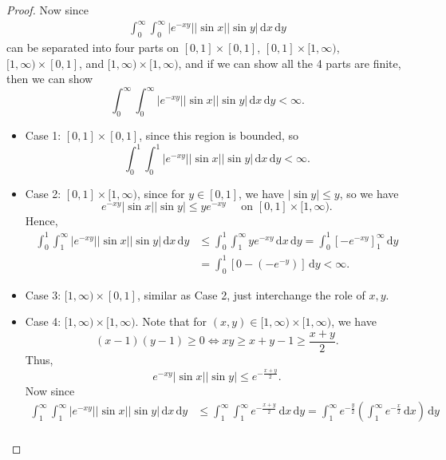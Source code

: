 \begin{proof}
    Now since 
    \begin{align*}
        \int _0^{\infty} \int _0^{\infty} \vert e^{-xy} \vert \vert \sin x \vert \vert \sin y \vert \, \mathrm{d} x \, \mathrm{d} y
    \end{align*}
    can be separated into four parts on \([0, 1] \times [0, 1]\), \([0, 1] \times [1, \infty)\), \([1, \infty) \times [0, 1]\), and \([1, \infty) \times [1, \infty)\), and if we can show all the 4 parts are finite, then we can show
    \[
        \int _0^{\infty} \int _0^{\infty} \vert e^{-xy} \vert \vert \sin x \vert \vert \sin y \vert \, \mathrm{d} x \, \mathrm{d} y < \infty.
    \] 
    \begin{itemize}
        \item Case 1: \([0, 1] \times [0, 1]\), since this region is bounded, so 
        \[
            \int _0^{1} \int _0^{1} \vert e^{-xy} \vert \vert \sin x \vert \vert \sin y \vert \, \mathrm{d} x \, \mathrm{d} y < \infty.
        \]
        \item Case 2: \([0, 1] \times [1, \infty)\), since for \(y \in [0, 1]\), we have \(\vert \sin y \vert \le y \), so we have 
        \[
            e^{-xy} \vert \sin x \vert \vert \sin y \vert \le y e^{-xy} \quad \text{ on } [0, 1] \times [1, \infty).   
        \]
        Hence,
        \begin{align*}
            \int _0^{1} \int _1^{\infty} \vert e^{-xy} \vert \vert \sin x \vert \vert \sin y \vert \, \mathrm{d} x \, \mathrm{d} y &\le \int _0^{1} \int _1^{\infty} y e^{-xy} \, \mathrm{d} x \, \mathrm{d} y = \int _0^1 \left[ - e^{-xy} \right]_1^{\infty} \, \mathrm{d} y \\
            &= \int _0^1 \left[ 0 - (-e^{-y}) \right] \, \mathrm{d} y < \infty.    
        \end{align*}
        \item Case 3: \([1, \infty) \times [0, 1]\), similar as Case 2, just interchange the role of \(x, y\). 
        \item Case 4: \([1, \infty) \times [1, \infty)\).  Note that for \((x, y) \in [1, \infty) \times [1, \infty)\), we have 
        \[
            (x - 1)(y - 1) \ge 0 \iff xy \ge x + y - 1 \ge \frac{x + y}{2}.
        \]
        Thus,
        \[
            e^{-xy} \vert \sin x \vert \vert \sin y \vert \le e^{- \frac{x+y}{2}}.  
        \]
        Now since 
        \begin{align*}
            \int _1^{\infty} \int _1^{\infty} \vert e^{-xy} \vert \vert \sin x \vert \vert \sin y \vert \, \mathrm{d} x \, \mathrm{d} y &\le \int _1^{\infty } \int _1^{\infty} e^{- \frac{x+y}{2}} \, \mathrm{d} x \, \mathrm{d} y = \int _1^{\infty} e^{-\frac{y}{2}} \left( \int _1^{\infty} e^{-\frac{x}{2}} \, \mathrm{d} x  \right) \, \mathrm{d} y \\

\end{align*}
\end{itemize}
\end{proof}
